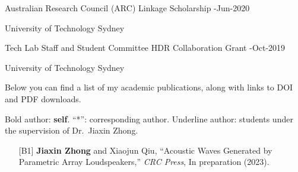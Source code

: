 \documentclass[10pt,a4paper,ragged2e,withhyper]{altacv}
\newcommand{\PubMe}[1]{\textbf{#1}}
\begin{document}
\divider

{\color{accent}Australian Research Council (ARC) Linkage Scholarship}
\hfill {}-Jun-2020
\par
University of Technology Sydney

\divider

{\color{accent}Tech Lab Staff and Student Committee HDR Collaboration Grant}
\hfill {}-Oct-2019
\par
University of Technology Sydney


\newpage
{}

Below you can find a list of my academic publications, along with links to {\color{accent}\aiDoi} DOI and {\color{accent}\faFilePdf[regular]} PDF downloads.

Bold author: \textbf{self}.
``*'': corresponding author.
Underline author: students under the supervision of Dr.\ Jiaxin Zhong.

\vspace{.5cm}


\begin{itemize}[leftmargin = 25pt]
    \justifying 
    \item[{[B1]}] \PubMe{Jiaxin Zhong} and Xiaojun Qiu, 
    ``Acoustic Waves Generated by Parametric Array Loudspeakers,'' 
    \textit{CRC Press}, In preparation (2023).
\end{itemize}

\divider


\end{document}
